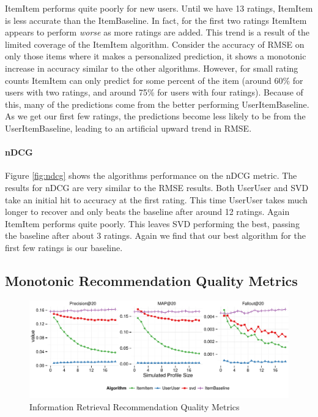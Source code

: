 \documentclass[letterpaper]{sig-alternate}
\begin{document}
  ItemItem performs quite poorly for new users.
  Until we have 13 ratings, ItemItem is less accurate than the ItemBaseline.
  In fact, for the first two ratings ItemItem appears to perform \emph{worse} as more ratings are added.
  This trend is a result of the limited coverage of the ItemItem algorithm.
  Consider the accuracy of RMSE on only those items where it makes a personalized prediction, it shows a monotonic increase in accuracy similar to the other algorithms.
  However, for small rating counts ItemItem can only predict for some percent of the item (around 60\% for users with two ratings, and around 75\% for users with four ratings).
  Because of this, many of the predictions come from the better performing UserItemBaseline.
  As we get our first few ratings, the predictions become less likely to be from the UserItemBaseline, leading to an artificial upward trend in RMSE.
  

  \paragraph{nDCG}
  Figure \ref{fig:ndcg} shows the algorithms performance on the nDCG metric.
  The results for nDCG are very similar to the RMSE results.
  Both UserUser and SVD take an initial hit to accuracy at the first rating.
  This time UserUser takes much longer to recover and only beats the baseline after around 12 ratings.
  Again ItemItem performs quite poorly.
  This leaves SVD performing the best, passing the baseline after about 3 ratings.
  Again we find that our best algorithm for the first few ratings is our baseline.
  


\subsection*{Monotonic Recommendation Quality Metrics}

\vspace{-1.5em}

\begin{figure}[ht!]
  \centering
  \includegraphics[width=\linewidth]{../lenskit/output/ekstrandTuned20/TopNPrecision.pdf}
  \caption{Information Retrieval Recommendation Quality Metrics}
  \label{fig:map}
\end{figure}
%
\end{document}
